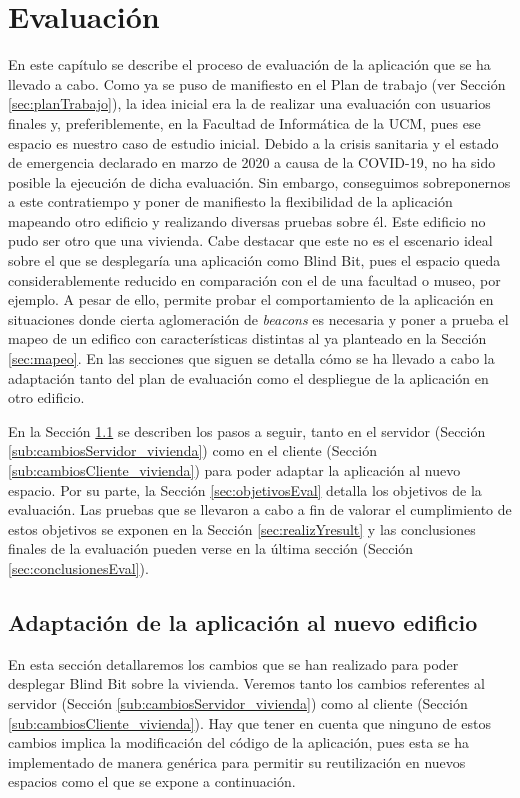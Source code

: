 \chapter{Evaluación}
\label{cap:evaluacion}

En este capítulo se describe el proceso de evaluación de la aplicación que se ha llevado a cabo. Como ya se puso de manifiesto en el Plan de trabajo (ver Sección \ref{sec:planTrabajo}), la idea inicial era la de realizar una evaluación con usuarios finales y, preferiblemente, en la Facultad de Informática de la UCM, pues ese espacio es nuestro caso de estudio inicial. Debido a la crisis sanitaria y el estado de emergencia declarado en marzo de 2020 a causa de la COVID-19, no ha sido posible la ejecución de dicha evaluación. Sin embargo, conseguimos sobreponernos a este contratiempo y poner de manifiesto la flexibilidad de la aplicación mapeando otro edificio y realizando diversas pruebas sobre él. Este edificio no pudo ser otro que una vivienda. Cabe destacar que este no es el escenario ideal sobre el que se desplegaría una aplicación como Blind Bit, pues el espacio queda considerablemente reducido en comparación con el de una facultad o museo, por ejemplo. A pesar de ello, permite probar el comportamiento de la aplicación en situaciones donde cierta aglomeración de \textit{beacons} es necesaria y poner a prueba el mapeo de un edifico con características distintas al ya planteado en la Sección \ref{sec:mapeo}. En las secciones que siguen se detalla cómo se ha llevado a cabo la adaptación tanto del plan de evaluación como el despliegue de la aplicación en otro edificio.

En la Sección \ref{sec:adaptacionApp} se describen los pasos a seguir, tanto en el servidor (Sección \ref{sub:cambiosServidor_vivienda}) como en el cliente (Sección \ref{sub:cambiosCliente_vivienda}) para poder adaptar la aplicación al nuevo espacio. Por su parte, la Sección \ref{sec:objetivosEval} detalla los objetivos de la evaluación. Las pruebas que se llevaron a cabo a fin de valorar el cumplimiento de estos objetivos se exponen en la Sección \ref{sec:realizYresult} y las conclusiones finales de la evaluación pueden verse en la última sección (Sección \ref{sec:conclusionesEval}).


\section{Adaptación de la aplicación al nuevo edificio}
\label{sec:adaptacionApp}

En esta sección detallaremos los cambios que se han realizado para poder desplegar Blind Bit sobre la vivienda. Veremos tanto los cambios referentes al servidor (Sección \ref{sub:cambiosServidor_vivienda}) como al cliente (Sección \ref{sub:cambiosCliente_vivienda}). Hay que tener en cuenta que ninguno de estos cambios implica la modificación del código de la aplicación, pues esta se ha implementado de manera genérica para permitir su reutilización en nuevos espacios como el que se expone a continuación.

